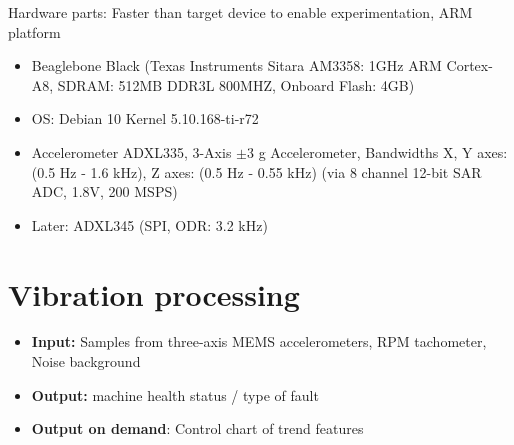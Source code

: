 Hardware parts:
Faster than target device to enable experimentation, ARM platform
\begin{itemize}
	\item Beaglebone Black 
		(Texas Instruments Sitara AM3358: 1GHz ARM Cortex-A8, 
		 SDRAM: 512MB DDR3L 800MHZ, 
		 Onboard Flash: 4GB)
	\item OS: Debian 10 Kernel 5.10.168-ti-r72
	\item Accelerometer ADXL335, 3-Axis $\pm$3 g Accelerometer, 
	      Bandwidths X, Y axes: (0.5 Hz - 1.6 kHz), Z axes: (0.5 Hz - 0.55 kHz)
	  (via 8 channel 12-bit SAR ADC, 1.8V, 200 MSPS)
	 \item Later: ADXL345 (SPI, ODR: 3.2 kHz) 
\end{itemize}

\section{Vibration processing}
 \begin{itemize}
 \itemsep0pt
\item \textbf{Input:} Samples from three-axis MEMS accelerometers, RPM tachometer, Noise background
\item \textbf{Output:} machine health status / type of fault
\item \textbf{Output on demand}: Control chart of trend features
\end{itemize}

